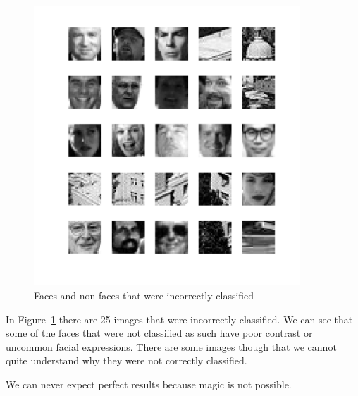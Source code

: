 \documentclass{article}
\begin{document}
\begin{figure}[h]
  \includegraphics[width=10cm]{faces.png}
  \caption{Faces and non-faces that were incorrectly classified}
  \label{fig:faces}
\end{figure}

In Figure~\ref{fig:faces} there are 25 images that were incorrectly
classified. We can see that some of the faces that were not classified
as such have poor contrast or uncommon facial expressions. There are
some images though that we cannot quite understand why they were not
correctly classified.

We can never expect perfect results because magic is not possible.
\end{document}
